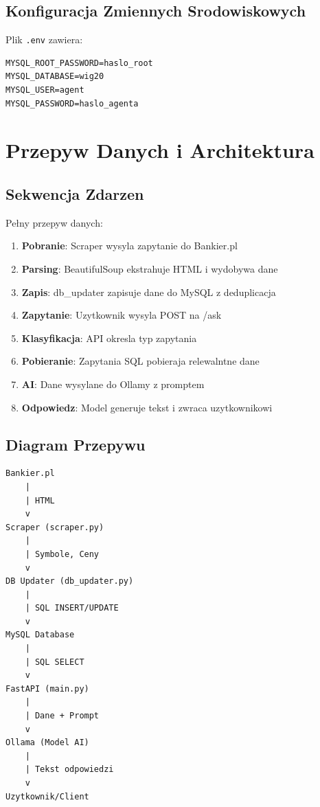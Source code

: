 \documentclass[11pt,a4paper]{article}
\begin{document}
\subsection{Konfiguracja Zmiennych Srodowiskowych}

Plik \texttt{.env} zawiera:
\begin{lstlisting}
MYSQL_ROOT_PASSWORD=haslo_root
MYSQL_DATABASE=wig20
MYSQL_USER=agent
MYSQL_PASSWORD=haslo_agenta
\end{lstlisting}

\section{Przepyw Danych i Architektura}

\subsection{Sekwencja Zdarzen}

Pełny przepyw danych:

\begin{enumerate}
    \item \textbf{Pobranie}: Scraper wysyla zapytanie do Bankier.pl
    \item \textbf{Parsing}: BeautifulSoup ekstrahuje HTML i wydobywa dane
    \item \textbf{Zapis}: db\_updater zapisuje dane do MySQL z deduplicacja
    \item \textbf{Zapytanie}: Uzytkownik wysyla POST na /ask
    \item \textbf{Klasyfikacja}: API okresla typ zapytania
    \item \textbf{Pobieranie}: Zapytania SQL pobieraja relewalntne dane
    \item \textbf{AI}: Dane wysylane do Ollamy z promptem
    \item \textbf{Odpowiedz}: Model generuje tekst i zwraca uzytkownikowi
\end{enumerate}

\subsection{Diagram Przepywu}

\begin{verbatim}
Bankier.pl
    |
    | HTML
    v
Scraper (scraper.py)
    |
    | Symbole, Ceny
    v
DB Updater (db_updater.py)
    |
    | SQL INSERT/UPDATE
    v
MySQL Database
    |
    | SQL SELECT
    v
FastAPI (main.py)
    |
    | Dane + Prompt
    v
Ollama (Model AI)
    |
    | Tekst odpowiedzi
    v
Uzytkownik/Client
\end{verbatim}
\end{document}
